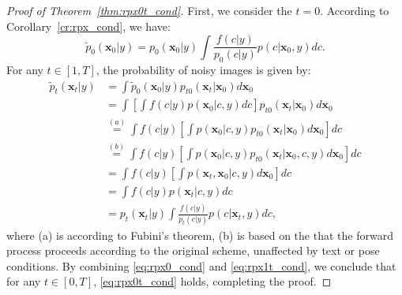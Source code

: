 \begin{proof}[Proof of Theorem~\ref{thm:rpx0t_cond}]
 First, we consider the $t=0$. According to Corollary~\ref{cr:rpx_cond}, we have:
\begin{equation}\label{eq:rpx0_cond}
 \tilde{p}_0(\boldsymbol{x}_0|y) = p_0(\boldsymbol{x}_0|y) \int \frac{f(c|y)}{p_0(c|y)} p(c | \boldsymbol{x}_0, y) dc.
\end{equation}
For any $t \in [1, T]$, the probability of noisy images is given by:
\begin{equation}\label{eq:rpx1t_cond}
    \begin{aligned}
        \tilde{p}_t(\boldsymbol{x}_t|y) &= \int\tilde{p}_0(\boldsymbol{x}_0|y)p_{t0}(\boldsymbol{x}_t|\boldsymbol{x}_0)d\boldsymbol{x}_0 \\
        &= \int \left[\int f(c|y) p(\boldsymbol{x}_0|c, y)dc\right]p_{t0}(\boldsymbol{x}_t|\boldsymbol{x}_0)d\boldsymbol{x}_0 \\
        &\overset{(a)}{=} \int f(c|y) \left[\int p(\boldsymbol{x}_0|c, y) p_{t0}(\boldsymbol{x}_t|\boldsymbol{x}_0) d \boldsymbol{x}_0\right] dc \\
        &\overset{(b)}{=} \int f(c|y) \left[\int p(\boldsymbol{x}_0|c, y) p_{t0}(\boldsymbol{x}_t|\boldsymbol{x}_0, c, y) d \boldsymbol{x}_0\right] dc \\
        &= \int f(c|y) \left[\int p(\boldsymbol{x}_t, \boldsymbol{x}_0|c, y)d \boldsymbol{x}_0\right] dc \\
        &= \int f(c|y)p(\boldsymbol{x}_t|c, y) dc \\
        &= p_t(\boldsymbol{x}_t|y) \int \frac{f(c|y)}{p_t(c|y)} p(c | \boldsymbol{x}_t, y) dc,
    \end{aligned}
\end{equation}
where (a) is according to Fubini's theorem, (b) is based on the that the forward process proceeds according to the original scheme, unaffected by text or pose conditions. By combining \eqref{eq:rpx0_cond} and \eqref{eq:rpx1t_cond}, we conclude that for any $t \in [0, T]$, \eqref{eq:rpx0t_cond} holds, completing the proof.
\end{proof}





